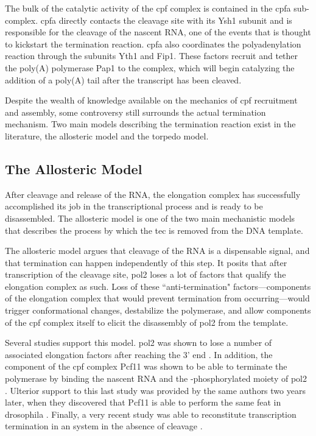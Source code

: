 The bulk of the catalytic activity of the \gls{cpf} complex is contained in the \gls{cpfa} sub-complex.
\gls{cpfa} directly contacts the cleavage site with its Ysh1 subunit and is responsible for the cleavage of the nascent RNA, one of the events that is thought to kickstart the termination reaction.
\gls{cpfa} also coordinates the polyadenylation reaction through the subunits Yth1 and Fip1. 
These factors recruit and tether the poly(A) polymerase Pap1 to the complex, which will begin catalyzing the addition of a poly(A) tail after the transcript has been cleaved.

Despite the wealth of knowledge available on the mechanics of \gls{cpf} recruitment and assembly, some controversy still surrounds the actual termination mechanism.
Two main models describing the termination reaction exist in the literature, the allosteric model and the torpedo model.

\subsection{The Allosteric Model}

After cleavage and release of the RNA, the elongation complex has successfully accomplished its job in the transcriptional process and is ready to be disassembled.
The allosteric model is one of the two main mechanistic models that describes the process by which the \gls{tec} is removed from the DNA template.

The allosteric model argues that cleavage of the RNA is a dispensable signal, and that termination can happen independently of this step.
It posits that after transcription of the cleavage site, \gls{pol2} loses a lot of factors that qualify the elongation complex as such.
Loss of these ``anti-termination" factors---components of the elongation complex that would prevent termination from occurring---would trigger conformational changes, destabilize the polymerase, and allow components of the \gls{cpf} complex itself to elicit the disassembly of \gls{pol2} from the template.

Several studies support this model. 
\gls{pol2} was shown to lose a number of associated elongation factors after reaching the 3' end \citep{kim:2004:transitions}.
In addition, the component of the \gls{cpf} complex Pcf11 was shown to be able to terminate the polymerase \invitro{} by binding the nascent RNA and the \sert{}-phosphorylated moiety of \gls{pol2} \citep{zhang:2005:ctddependent}.
Ulterior support to this last study was provided by the same authors two years later, when they discovered that Pcf11 is able to perform the same feat in drosophila \citep{zhang:2006:pcf11}.
Finally, a very recent study was able to reconstitute transcription termination in an \invitro{} system in the absence of cleavage \citep{zhang:2015:polya}.

